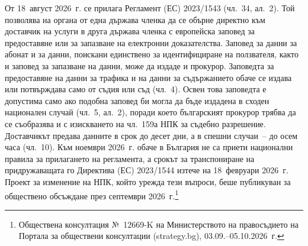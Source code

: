 От 18~август 2026~г. се прилага Регламент (ЕС) 2023/1543 (чл.~34, ал.~2). Той позволява
на органа от една държава членка да се обърне директно към доставчик на услуги в друга
държава членка с европейска заповед за предоставяне или за запазване на електронни
доказателства. Заповед за данни за абонат и за данни, поискани единствено за
идентифициране на ползвателя, както и заповед за запазване на данни, може да издаде и
прокурор. Заповедта за предоставяне на данни за трафика и на данни за съдържанието обаче
се издава или потвърждава само от съдия или съд (чл.~4). Освен това заповедта е
допустима само ако подобна заповед би могла да бъде издадена в сходен национален случай
(чл.~5, ал.~2), поради което българският прокурор трябва да се съобразява и с изискването
на чл.~159а НПК за съдебно разрешение. Доставчикът предава данните в срок до десет дни, а в
спешни случаи~-- до осем часа (чл.~10). Към
ноември 2026~г. обаче в България не са приети национални правила за прилагането на
регламента, а срокът за транспониране на придружаващата го Директива (ЕС) 2023/1544
изтече на 18~февруари 2026~г. Проект за изменение на НПК, който урежда тези въпроси, беше публикуван за обществено обсъждане през септември
2026~г.\footnote{Обществена консултация №~12669-K на Министерството на правосъдието на
Портала за обществени консултации (strategy.bg), 03.09.--05.10.2026~г.}
